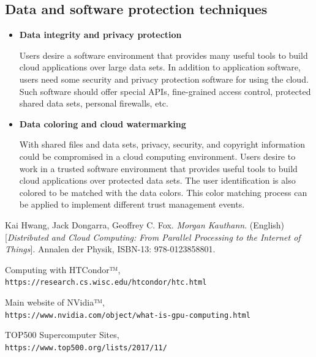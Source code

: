 \documentclass[12pt]{report}
\begin{document}
\subsection*{Data and software protection techniques}
\begin{itemize}
\item \textbf{Data integrity and privacy protection}

		Users desire a software environment that provides many useful tools to build cloud applications over large data sets. In addition to application software, users need some security and privacy protection software for using the cloud. Such software should offer special APIs, fine-grained access control, protected shared data sets, personal firewalls, etc.
        
\item \textbf{Data coloring and cloud watermarking}

		With shared files and data sets, privacy, security, and copyright information could be compromised in a cloud computing environment. Users desire to work in a trusted software environment that provides useful tools to build cloud applications over protected data sets. The user identification is also colored to be matched with the data colors. This color matching process can be applied to implement different trust management events.
\end{itemize}


\begin{thebibliography}{9}
Kai Hwang, Jack Dongarra, Geoffrey C. Fox.
\textit{Morgan Kauthann}. (English) 
[\textit{Distributed and Cloud Computing: From Parallel Processing to the Internet of Things}]. 
Annalen der Physik, ISBN-13: 978-0123858801.

Computing with HTCondor™,
\\\texttt{https://research.cs.wisc.edu/htcondor/htc.html}

Main website of NVidia™,
\\\texttt{https://www.nvidia.com/object/what-is-gpu-computing.html}

TOP500 Supercomputer Sites,
\\\texttt{https://www.top500.org/lists/2017/11/}

\end{thebibliography}
\end{document}
